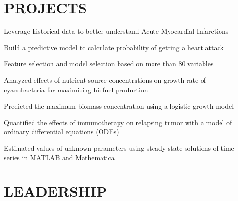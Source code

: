 \documentclass[]{deedy-resume-openfont}
\begin{document}
\begin{minipage}[t]{0.66\textwidth}
\begin{tightemize}
\end{tightemize}
\sectionsep


\section{PROJECTS}
\begin{tightemize}
\item Leverage historical data to better understand Acute Myocardial Infarctions
\item Build a predictive model to calculate probability of getting a heart attack
\item Feature selection and model selection based on more than 80 variables
\end{tightemize}
\sectionsep

\begin{tightemize}
\item Analyzed effects of nutrient source concentrations on growth rate of cyanobacteria for maximising biofuel production
\item Predicted the maximum biomass concentration using a logistic growth model
\end{tightemize}
\sectionsep

\begin{tightemize}
\item Quantified the effects of immunotherapy on relapsing tumor with a model of ordinary differential equations (ODEs) 
\item Estimated values of unknown parameters using steady-state solutions of time series in MATLAB and Mathematica
\end{tightemize}
\sectionsep


\section{LEADERSHIP} 


\end{minipage}
\end{document}
